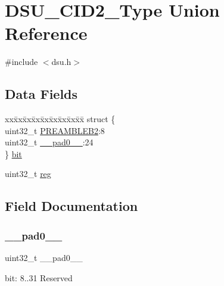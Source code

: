 \hypertarget{union_d_s_u___c_i_d2___type}{}\section{D\+S\+U\+\_\+\+C\+I\+D2\+\_\+\+Type Union Reference}
\label{union_d_s_u___c_i_d2___type}


{\ttfamily \#include $<$dsu.\+h$>$}

\subsection*{Data Fields}
\begin{DoxyCompactItemize}
\item 
\begin{tabbing}
xx\=xx\=xx\=xx\=xx\=xx\=xx\=xx\=xx\=\kill
struct \{\\
\>uint32\_t \mbox{\hyperlink{union_d_s_u___c_i_d2___type_a8a84d2ae965a94dc3afde1bbce29324b}{PREAMBLEB2}}:8\\
\>uint32\_t \mbox{\hyperlink{union_d_s_u___c_i_d2___type_a3e57c2ef1c3ffb36722f000cc1156824}{\_\_pad0\_\_}}:24\\
\} \mbox{\hyperlink{union_d_s_u___c_i_d2___type_aaf732a7206bb5da19d48d8e36404768b}{bit}}\\

\end{tabbing}\item 
uint32\+\_\+t \mbox{\hyperlink{union_d_s_u___c_i_d2___type_a6b91636401516a477989a336376d7b40}{reg}}
\end{DoxyCompactItemize}


\subsection{Field Documentation}
\mbox{\label{union_d_s_u___c_i_d2___type_a3e57c2ef1c3ffb36722f000cc1156824}} 
\subsubsection{\texorpdfstring{\_\_pad0\_\_}{\_\_pad0\_\_}}
{\footnotesize\ttfamily uint32\+\_\+t \+\_\+\+\_\+pad0\+\_\+\+\_\+}

bit\+: 8..31 Reserved \mbox{\label{union_d_s_u___c_i_d2___type_aaf732a7206bb5da19d48d8e36404768b}} 
